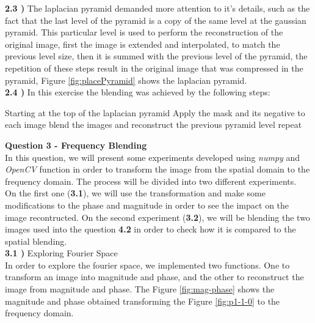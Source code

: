 \documentclass[12pt,a4paper]{article}
\begin{document}
\textbf{2.3 )} The laplacian pyramid demanded more attention to it's details, such as the fact that the last level of the pyramid is a copy of the same level at the gaussian pyramid. This particular level is used to perform the reconstruction of the original image, first the image is extended and interpolated, to match the previous level size, then it is summed with the previous level of the pyramid, the repetition of these steps result in the original image that was compressed in the pyramid, Figure \ref{fig:placePyramid} shows the laplacian pyramid. \\

\textbf{2.4 )} In this exercise the blending was achieved by the following steps:

Starting at the top of the laplacian pyramid
Apply the mask and its negative to each image
blend the images and reconstruct the previous pyramid level
repeat

\newpage

\textbf{\LARGE Question 3 - Frequency Blending} \\

In this question, we will present some experiments developed using \emph{numpy} and \emph{OpenCV} function in order to transform the image from the spatial domain to the frequency domain. The process will be divided into two different experiments. \\

On the first one (\textbf{3.1}), we will use the transformation and make some modifications to the phase and magnitude in order to see the impact on the image recontructed. On the second experiment (\textbf{3.2}), we will be blending the two images used into the question \textbf{4.2} in order to check how it is compared to the spatial blending. \\

\textbf{3.1 )} Exploring Fourier Space \\

In order to explore the fourier space, we implemented two functions. One to transform an image into magnitude and phase, and the other to reconstruct the image from magnitude and phase. The Figure \ref{fig:mag-phase} shows the magnitude and phase obtained transforming the Figure \ref{fig:p1-1-0} to the frequency domain. \\
\end{document}
